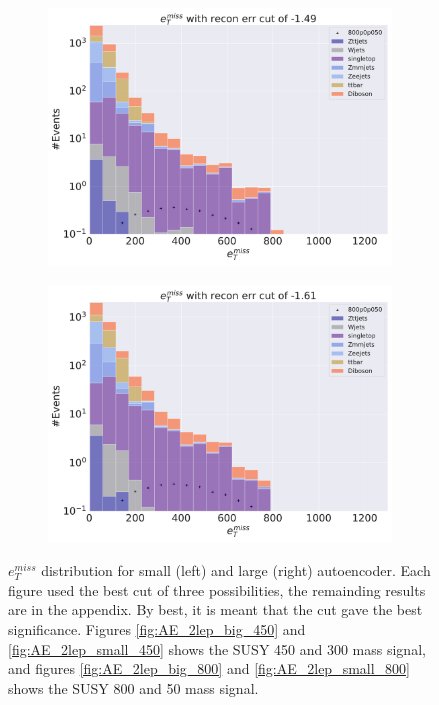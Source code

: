 \begin{figure}[H]
    \hfill
    \begin{subfigure}{.45\textwidth}
        \includegraphics[width=\textwidth]{Figures/AE_testing/big/2lep/b_data_recon_big_rm3_feats_sig_800p0p050_recon_errcut_-1.49.pdf}
        \caption{}
        \label{fig:AE_2lep_big_800_cut_etmiss}
    \end{subfigure}
    \hfill   
    \begin{subfigure}{.45\textwidth}
        \includegraphics[width=\textwidth]{Figures/AE_testing/small/2lep/b_data_recon_big_rm3_feats_sig_800p0p050_recon_errcut_-1.61.pdf}
        \caption{}
        \label{fig:AE_2lep_small_800_cut_etmiss}
    \end{subfigure}
    \hfill      
    \caption[$e_T^{miss}$ best cuts for regular autoencoder]{$e_T^{miss}$ distribution for small (left) and large (right) autoencoder.
    Each figure used the best cut of three possibilities, the remainding results are in the appendix. By best, it is meant that the cut
    gave the best significance. Figures \ref{fig:AE_2lep_big_450} and \ref{fig:AE_2lep_small_450} shows the SUSY 450 and 300 mass signal, 
    and figures \ref{fig:AE_2lep_big_800} and \ref{fig:AE_2lep_small_800} shows the SUSY 800 and 50 mass signal.}
    \label{fig:AE_2lep_recon_err_both_sig_cut_etmiss}
\end{figure}

